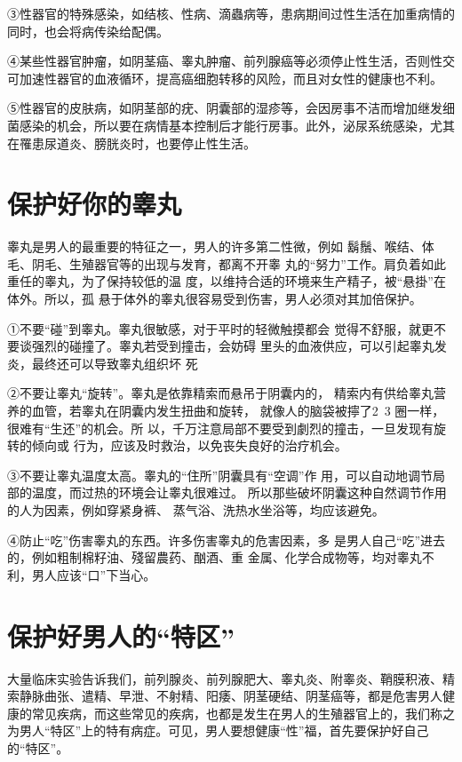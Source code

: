 \documentclass[12pt,UTF8]{ctexbook}
\begin{document}
③性器官的特殊感染，如结核、性病、滴蟲病等，患病期间过性生活在加重病情的同时，也会将病传染给配偶。

④某些性器官肿瘤，如阴茎癌、睾丸肿瘤、前列腺癌等必须停止性生活，否则性交可加速性器官的血液循环，提高癌细胞转移的风险，而且对女性的健康也不利。

⑤性器官的皮肤病，如阴茎部的疣、阴囊部的湿疹等，会因房事不洁而增加继发细菌感染的机会，所以要在病情基本控制后才能行房事。此外，泌尿系统感染，尤其在罹患尿道炎、膀胱炎时，也要停止性生活。

\section{保护好你的睾丸}

睾丸是男人的最重要的特征之一，男人的许多第二性微，例如
鬍鬚、喉结、体毛、阴毛、生殖器官等的出现与发育，都离不开睾
丸的“努力”工作。肩负着如此重任的睾丸，为了保持较低的温
度，以维持合适的环境来生产精子，被“悬掛”在体外。所以，孤
悬于体外的睾丸很容易受到伤害，男人必须对其加倍保护。

①不要“碰”到睾丸。睾丸很敏感，对于平时的轻微触摸都会
觉得不舒服，就更不要谈强烈的碰撞了。睾丸若受到撞击，会妨碍
里头的血液供应，可以引起睾丸发炎，最终还可以导致睾丸组织坏
死

②不要让睾丸“旋转”。睾丸是依靠精索而悬吊于阴囊内的，
精索内有供给睾丸营养的血管，若睾丸在阴囊内发生扭曲和旋转，
就像人的脑袋被擰了2~3 圈一样，很难有“生还”的机会。所
以，千万注意局部不要受到劇烈的撞击，一旦发现有旋转的倾向或
行为，应该及时救治，以免丧失良好的治疗机会。

③不要让睾丸温度太高。睾丸的“住所”阴囊具有“空调”作
用，可以自动地调节局部的温度，而过热的环境会让睾丸很难过。
所以那些破坏阴囊这种自然调节作用的人为因素，例如穿紧身裤、
蒸气浴、洗热水坐浴等，均应该避免。

④防止“吃”伤害睾丸的东西。许多伤害睾丸的危害因素，多
是男人自己“吃”进去的，例如粗制棉籽油、殘留農药、酗酒、重
金属、化学合成物等，均对睾丸不利，男人应该“口”下当心。

\section{保护好男人的“特区”}

大量临床实验告诉我们，前列腺炎、前列腺肥大、睾丸炎、附睾炎、鞘膜积液、精索静脉曲张、遣精、早泄、不射精、阳痿、阴茎硬结、阴茎癌等，都是危害男人健康的常见疾病，而这些常见的疾病，也都是发生在男人的生殖器官上的，我们称之为男人“特区”上的特有病症。可见，男人要想健康“性”福，首先要保护好自己的“特区”。
\end{document}
